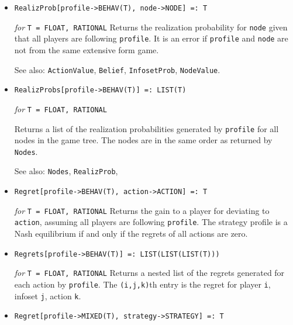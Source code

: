 \begin{itemize}
\item{}
\protect \large \begin{verbatim}
RealizProb[profile->BEHAV(T), node->NODE] =: T
\end{verbatim}\normalsize

{\it for} {\tt T = FLOAT, RATIONAL}
\bd
Returns the realization probability for \verb+node+ given that all players
are following \verb+profile+.  It is an error if \verb+profile+ and
\verb+node+ are not from the same extensive form game.
\item [See also:] \verb+ActionValue+, \verb+Belief+, \verb+InfosetProb+,
\verb+NodeValue+.
\ed

\item{}
\protect \large \begin{verbatim}
RealizProbs[profile->BEHAV(T)] =: LIST(T)
\end{verbatim}\normalsize

{\it for} {\tt T = FLOAT, RATIONAL}
\bd

Returns a list of the realization probabilities generated by
\verb+profile+ for all nodes in the game tree.  The nodes are in the
same order as returned by \verb+Nodes+.
\item [See also:] \verb+Nodes+, \verb+RealizProb+, 
\ed

\item{}
\protect \large \begin{verbatim}
Regret[profile->BEHAV(T), action->ACTION] =: T
\end{verbatim} \normalsize

{\it for} {\tt T = FLOAT, RATIONAL}
\bd
Returns the gain to a player for deviating to \verb+action+, assuming
all players are following \verb+profile+.  The strategy profile is
a Nash equilibrium if and only if the regrets of all actions are zero.
\ed

\item{}
\protect \large \begin{verbatim}
Regrets[profile->BEHAV(T)] =: LIST(LIST(LIST(T)))
\end{verbatim} \normalsize

{\it for} {\tt T = FLOAT, RATIONAL}
\bd
Returns a nested list of the regrets generated for each action by
\verb+profile+.  The \verb+(i,j,k)+th entry is the regret for player
\verb+i+, infoset \verb+j+, action \verb+k+.
\ed

\item{}
\protect \large \begin{verbatim}
Regret[profile->MIXED(T), strategy->STRATEGY] =: T
\end{verbatim} \normalsize


\end{itemize}
